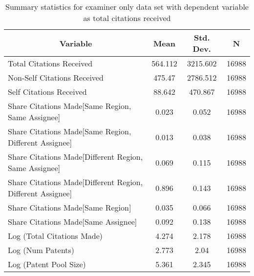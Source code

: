 
\begin{table}[htbp]\centering \caption{Summary statistics for examiner only data set with dependent variable as total citations received  \label{e.tsummary}}
\begin{tabular}{l c c  c}\hline\hline
\multicolumn{1}{c}{\textbf{Variable}} & \textbf{Mean}
 & \textbf{Std. Dev.} & \textbf{N}\\ \hline
Total Citations Received & 564.112 & 3215.602  & 16988\\
Non-Self Citations Received & 475.47 & 2786.512  & 16988\\
Self Citations Received & 88.642 & 470.867  & 16988\\
Share Citations Made[Same Region, Same Assignee] & 0.023 & 0.052  & 16988\\
Share Citations Made[Same Region, Different Assignee] & 0.013 & 0.038  & 16988\\
Share Citations Made[Different Region, Same Assignee] & 0.069 & 0.115  & 16988\\
Share Citations Made[Different Region, Different Assignee] & 0.896 & 0.143  & 16988\\
Share Citations Made[Same Region] & 0.035 & 0.066  & 16988\\
Share Citations Made[Same Assignee] & 0.092 & 0.138  & 16988\\
Log (Total Citations Made) & 4.274 & 2.178  & 16988\\
Log (Num Patents) & 2.773 & 2.04  & 16988\\
Log (Patent Pool Size) & 5.361 & 2.345  & 16988\\
\hline\end{tabular}
\end{table}
